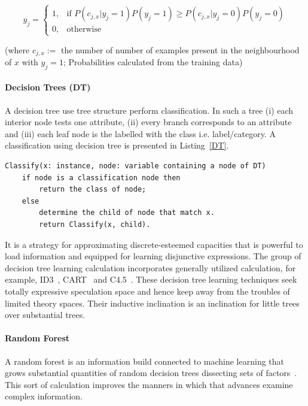 \begin{equation}
 y_{j} = 
\begin{cases}
    1, & \text{if } P(c_{j,x}|y_j = 1)P(y_j = 1) \geq P(c_{j,x}|y_j = 0)P(y_j = 0) \\
    0, & \text{otherwise}
\end{cases}
\end{equation}

(where $c_{j,x} :=$ the number of number of examples present in the neighbourhood of $x$ with $y_j = 1$; Probabilities calculated from the training data)

\paragraph{Decision Trees (DT)}
A decision tree use tree structure perform classification. In such a tree (i) each interior node tests one attribute, (ii) every branch corresponds to an attribute and (iii) each leaf node is the labelled with the class i.e. label/category. A classification using decision tree is presented in Listing~\ref{DT}.
\begin{lstlisting}[caption = Classification with Decision Trees, label = DT]
Classify(x: instance, node: variable containing a node of DT)
    if node is a classification node then
        return the class of node;
    else
        determine the child of node that match x.
        return Classify(x, child).

\end{lstlisting}

It is a strategy for approximating discrete-esteemed capacities that is powerful to load information and equipped for learning disjunctive expressions. The group of decision tree learning calculation incorporates generally utilized calculation, for example, ID3~\cite{quinlan1986induction}, CART~\cite{breiman2017classification} and C4.5~\cite{xiaoliang2009research}. These decision tree learning techniques seek totally expressive speculation space and hence keep away from the troubles of limited theory spaces. Their inductive inclination is an inclination for little trees over substantial trees. 

\paragraph{Random Forest}
A random forest is an information build connected to machine learning that grows substantial quantities of random decision trees dissecting sets of factors~\cite{breiman2001random}. This sort of calculation improves the manners in which that advances examine complex information. 

